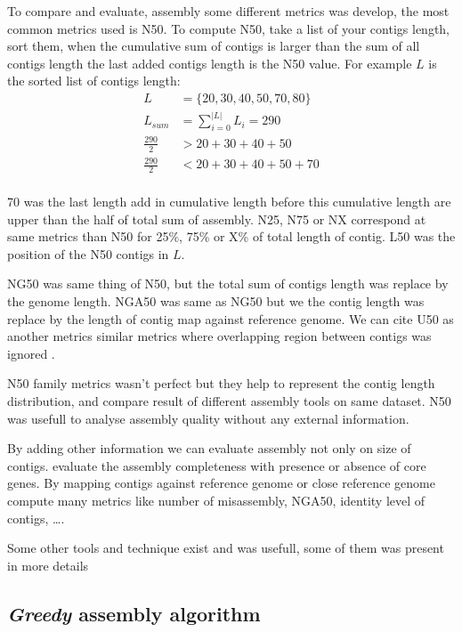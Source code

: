 \documentclass[./main.tex]{subfiles}
\begin{document}
To compare and evaluate, assembly some different metrics was develop, the most common metrics used is N50.
To compute N50, take a list of your contigs length, sort them, when the cumulative sum of contigs is larger than the sum of all contigs length the last added contigs length is the N50 value. For example $L$ is the sorted list of contigs length: 
\begin{equation}
\begin{aligned}
L &= \{20, 30, 40, 50, 70, 80\} \\
L_{sum} &= \sum\limits_{i=0}^{|L|} L_i = 290 \\
\frac{290}{2} &> 20 + 30 + 40 + 50 \\
\frac{290}{2} &< 20 + 30 + 40 + 50 + 70\\
\end{aligned}
\end{equation}

70 was the last length add in cumulative length before this cumulative length are upper than the half of total sum of assembly. N25, N75 or NX correspond at same metrics than N50 for 25\%, 75\% or X\% of total length of contig. L50 was the position of the N50 contigs in $L$.

NG50 was same thing of N50, but the total sum of contigs length was replace by the genome length. NGA50 was same as NG50 but we the contig length was replace by the length of contig map against reference genome. We can cite U50 as another metrics similar metrics where overlapping region between contigs was ignored \cite{U50}.

N50 family metrics wasn't perfect but they help to represent the contig length distribution, and compare result of different assembly tools on same dataset. N50 was usefull to analyse assembly quality without any external information.

By adding other information we can evaluate assembly not only on size of contigs. \cite{busco} evaluate the assembly completeness with presence or absence of core genes. By mapping contigs against reference genome or close reference genome  compute many metrics like number of misassembly, NGA50, identity level of contigs, …. 

Some other tools and technique exist and was usefull, some of them was present in more details \cite{seq_assembly_demystified}

\subsection{\textit{Greedy} assembly algorithm}
\end{document}
